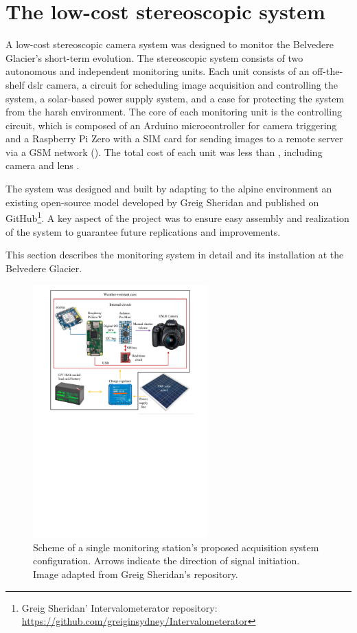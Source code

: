 \section{The low-cost stereoscopic system}\label{sec:4:system}

A low-cost stereoscopic camera system was designed to monitor the Belvedere Glacier's short-term evolution. 
The stereoscopic system consists of two autonomous and independent monitoring units. 
Each unit consists of an off-the-shelf \ac{dslr} camera, a circuit for scheduling image acquisition and controlling the system, a solar-based power supply system, and a case for protecting the system from the harsh environment. 
The core of each monitoring unit is the controlling circuit, which is composed of an Arduino microcontroller for camera triggering and a Raspberry Pi Zero with a SIM card for sending images to a remote server via a GSM network ().
The total cost of each unit was less than , including camera and lens \citep{ioli2023_replicable}.

The system was designed and built by adapting to the alpine environment an existing open-source model developed by Greig Sheridan and published on
GitHub\footnote{\label{foot:greig}Greig Sheridan' Intervalometerator repository: \url{https://github.com/greiginsydney/Intervalometerator}}.
A key aspect of the project was to ensure easy assembly and realization of the system to guarantee future replications and improvements.

This section describes the monitoring system in detail and its installation at the Belvedere Glacier.

\begin{figure}[ht!]
  \centering
  \includegraphics[width=0.6\textwidth]{schema.pdf}
  \caption{Scheme of a single monitoring station's proposed acquisition system configuration. Arrows indicate the direction of signal initiation. Image adapted
    from Greig Sheridan's repository.}
  \label{fig:4:scheme_foto}
\end{figure}


